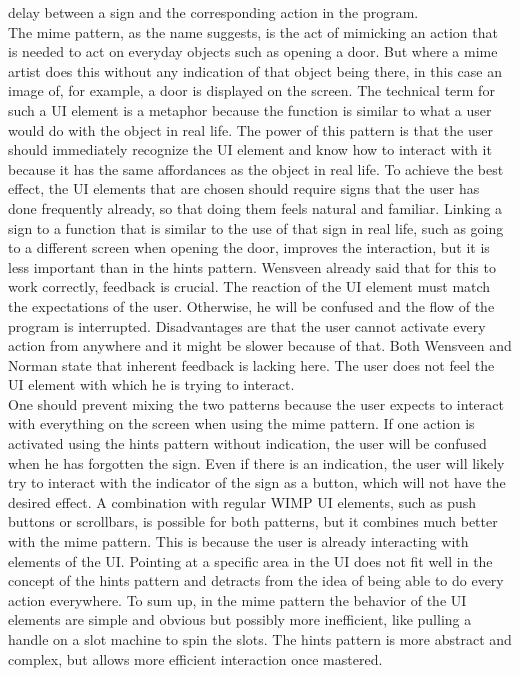 delay between a sign and the corresponding action in the program.\\

The mime pattern, as the name suggests, is the act of mimicking an action that is needed to act on everyday objects such as opening a door. But where a mime artist does this without any indication of that object being there, in this case an image of, for example, a door is displayed on the screen. The technical term for such a UI element is a metaphor because the function is similar to what a user would do with the object in real life. The power of this pattern is that the user should immediately recognize the UI element and know how to interact with it because it has the same affordances as the object in real life. To achieve the best effect, the UI elements that are chosen should require signs that the user has done frequently already, so that doing them feels natural and familiar. Linking a sign to a function that is similar to the use of that sign in real life, such as going to a different screen when opening the door, improves the interaction, but it is less important than in the hints pattern. Wensveen \cite{Wensveen2004} already said that for this to work correctly, feedback is crucial. The reaction of the UI element must match the expectations of the user. Otherwise, he will be confused and the flow of the program is interrupted. Disadvantages are that the user cannot activate every action from anywhere and it might be slower because of that. Both Wensveen \cite{Wensveen2004} and Norman \cite{Norman2010} state that inherent feedback is lacking here. The user does not feel the UI element with which he is trying to interact.\\

One should prevent mixing the two patterns because the user expects to interact with everything on the screen when using the mime pattern. If one action is activated using the hints pattern without indication, the user will be confused when he has forgotten the sign. Even if there is an indication, the user will likely try to interact with the indicator of the sign as a button, which will not have the desired effect. A combination with regular WIMP UI elements, such as push buttons or scrollbars, is possible for both patterns, but it combines much better with the mime pattern. This is because the user is already interacting with elements of the UI. Pointing at a specific area in the UI does not fit well in the concept of the hints pattern and detracts from the idea of being able to do every action everywhere. To sum up, in the mime pattern the behavior of the UI elements are simple and obvious but possibly more inefficient, like pulling a handle on a slot machine to spin the slots. The hints pattern is more abstract and complex, but allows more efficient interaction once mastered.


